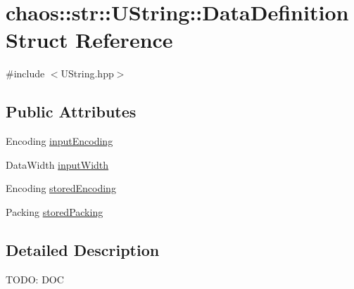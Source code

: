 \hypertarget{structchaos_1_1str_1_1_u_string_1_1_data_definition}{\section{chaos\-:\-:str\-:\-:U\-String\-:\-:Data\-Definition Struct Reference}
\label{structchaos_1_1str_1_1_u_string_1_1_data_definition}
}


{\ttfamily \#include $<$U\-String.\-hpp$>$}

\subsection*{Public Attributes}
\begin{DoxyCompactItemize}
\item 
Encoding \hyperlink{structchaos_1_1str_1_1_u_string_1_1_data_definition_a2f920e8c20c0c6e0a0a473e9772d99e1}{input\-Encoding}
\item 
Data\-Width \hyperlink{structchaos_1_1str_1_1_u_string_1_1_data_definition_ad8799df92d7d3ec4668675d918654df8}{input\-Width}
\item 
Encoding \hyperlink{structchaos_1_1str_1_1_u_string_1_1_data_definition_affc7bf4241c9d762501b8273e7c5536d}{stored\-Encoding}
\item 
Packing \hyperlink{structchaos_1_1str_1_1_u_string_1_1_data_definition_acdc0f7cef212180b4a3b6180bdd3b1bb}{stored\-Packing}
\end{DoxyCompactItemize}


\subsection{Detailed Description}
T\-O\-D\-O\-: D\-O\-C 

